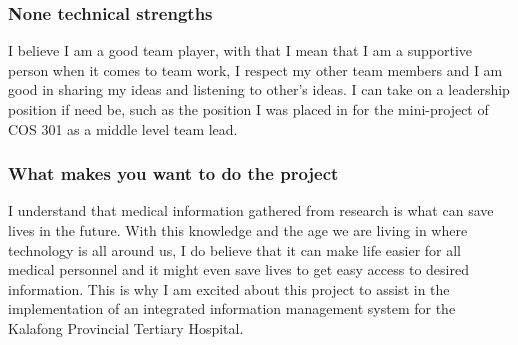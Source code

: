 \documentclass[hidelinks, 12pt, oneside]{article}
\begin{document}
\subsubsection{None technical strengths}
I believe I am a good team player, with that I mean that I am a supportive
person when it comes to team work, I respect my other team members and
I am good in sharing my ideas and listening to other's ideas. I can take on
a leadership position if need be, such as the position I was placed in for the
mini-project of COS 301 as a middle level team lead.

\subsubsection{What makes you want to do the project}
I understand that medical information gathered from research is what can save lives in the future. With this knowledge and the age we are living in where technology is all around us, I do believe that it can make life easier for all medical personnel and it might even   save lives to get easy access to desired information. This is why I am excited about this project to assist in  the implementation of an integrated information management system  for the Kalafong Provincial Tertiary Hospital.
\end{document}
